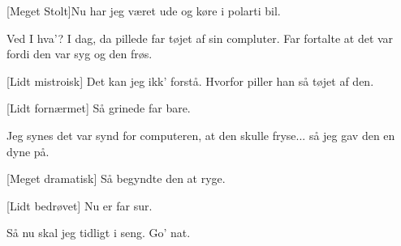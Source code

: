 \documentclass[a4paper]{article}
\begin{document}
\begin{sketch}
[Meget Stolt]Nu har jeg været ude og køre i polarti bil. 

 Ved I hva'? I dag, da pillede far tøjet af sin
compluter. Far fortalte at det var fordi den var syg og den
frøs. 

[Lidt mistroisk] Det kan jeg ikk' forstå. 
Hvorfor piller han så tøjet af den.

[Lidt fornærmet] Så grinede far bare. 

 Jeg synes det var synd for computeren, at den skulle
fryse... så jeg gav den en dyne på.  

[Meget dramatisk] Så begyndte den at ryge. 

[Lidt bedrøvet] Nu er far sur.

 Så nu skal jeg tidligt i seng.
 Go' nat.  

\end{sketch}
\end{document}
